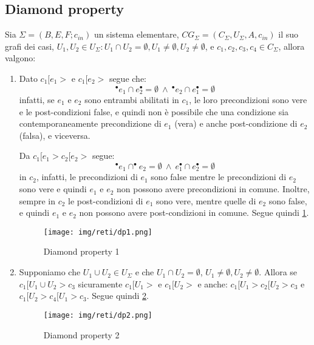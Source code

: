\subsection{Diamond property}
\begin{definizione} 
    Sia $\Sigma = (B, E, F; c_{in})$ un sistema elementare,
    $CG_{\Sigma} = (C_{\Sigma},U_{\Sigma}, A, c_{in})$ il suo grafi dei casi,
    $U_1,U_2 \in U_{\Sigma}: U_1 \cap U_2 = \emptyset, U_1 \neq \emptyset, U_2
        \neq \emptyset$, e $c_1, c_2, c_3, c_4 \in C_{\Sigma}$, allora valgono:
    \begin{enumerate}
        \item Dato $c_1[e_1 >$ e $c_1[e_2 >$ segue che:
              \begin{equation}
                  ^{\bullet}e_1 \cap e_2^{\bullet} = \emptyset \ \land \
                  ^{\bullet}e_2 \cap e_1^{\bullet} = \emptyset
              \end{equation}
              infatti, se $e_1$ e $e_2$ sono entrambi abilitati in $c_1$, le loro
              precondizioni sono vere e le post-condizioni false, e quindi non è
              possibile che una condizione sia contemporaneamente precondizione di
              $e_1$ (vera) e anche post-condizione di $e_2$ (falsa), e viceversa.

              Da $c_1[e_1 > c_2[e_2  >$ segue:
              \begin{equation}
                  ^{\bullet} e_1 \cap ^{\bullet} e_2 = \emptyset \ \land \
                  e_1^{\bullet} \cap e_2^{\bullet} = \emptyset
              \end{equation}
              in $c_2$, infatti, le precondizioni di $e_1$ sono false mentre le
              precondizioni di $e_2$ sono vere e quindi $e_1$ e $e_2$ non possono
              avere precondizioni in comune. Inoltre, sempre in $c_2$ le post-condizioni
              di $e_1$ sono vere, mentre quelle di $e_2$ sono false, e quindi
              $e_1$ e $e_2$ non possono avere post-condizioni in comune. Segue
              quindi \ref{fig:dp1}.
              \begin{figure}[!ht]
                  \centering
                  \texttt{[image: img/reti/dp1.png]}
                  \caption{Diamond property 1}
                  \label{fig:dp1}
              \end{figure}
        \item Supponiamo che $U_1 \cup U_2 \in U_{\Sigma}$ e che
              $U_1 \cap U_2 = \emptyset$, $U_1 \neq \emptyset, U_2 \neq \emptyset$.
              Allora se $c_1[U_1 \cup U_2 >c_3$ sicuramente $c_1[U_1 >$ e $c_1[U_2 >$
              e anche: $c_1[U_1 > c_2[U_2 >c_3$ e $c_1[U_2 > c_4[U_1 >c_3$. Segue
              quindi \ref{fig:dp2}.
              \begin{figure}[!ht]
                  \centering
                  \texttt{[image: img/reti/dp2.png]}
                  \caption{Diamond property 2}
                  \label{fig:dp2}
              \end{figure}
    \end{enumerate}
\end{definizione}
